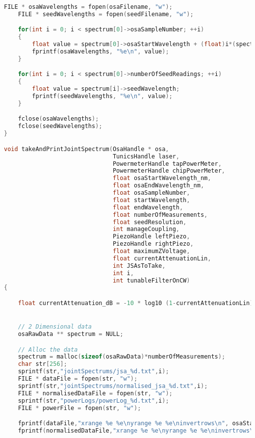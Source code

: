 \begin{lstlisting}[style=customc, language=C]
    FILE * osaWavelengths = fopen(osaFilename, "w");
    FILE * seedWavelengths = fopen(seedFilename, "w");

    for(int i = 0; i < spectrum[0]->osaSampleNumber; ++i)
    {
        float value = spectrum[0]->osaStartWavelength + (float)i*(spectrum[0]->osaEndWavelength - spectrum[0]->osaStartWavelength)/(float)(spectrum[0]->osaSampleNumber-1);
        fprintf(osaWavelengths, "%e\n", value);
    }

    for(int i = 0; i < spectrum[0]->numberOfSeedReadings; ++i)
    {
        float value = spectrum[i]->seedWavelength;
        fprintf(seedWavelengths, "%e\n", value);
    }

    fclose(osaWavelengths);
    fclose(seedWavelengths);
}

void takeAndPrintJointSpectrum(OsaHandle * osa,
                               TunicsHandle laser,
                               PowermeterHandle tapPowerMeter,
                               PowermeterHandle chipPowerMeter,
                               float osaStartWavelength_nm,
                               float osaEndWavelength_nm,
                               float osaSampleNumber,
                               float startWavelength,
                               float endWavelength,
                               float numberOfMeasurements,
                               float seedResolution,
                               int manageCoupling,
                               PiezoHandle leftPiezo,
                               PiezoHandle rightPiezo,
                               float maximumZVoltage,
                               float currentAttenuationLin,
                               int JSAsToTake,
                               int i,
                               int tunableFilterOnCW)
{

    float currentAttenuation_dB = -10 * log10 (1-currentAttenuationLin);


    // 2 Dimensional data
    osaRawData ** spectrum = NULL;

    // Alloc the data
    spectrum = malloc(sizeof(osaRawData)*numberOfMeasurements);
    char str[256];
    sprintf(str,"jointSpectrums/jsa_%d.txt",i);
    FILE * dataFile = fopen(str, "w");
    sprintf(str,"jointSpectrums/normalised_jsa_%d.txt",i);
    FILE * normalisedDataFile = fopen(str, "w");
    sprintf(str,"powerLogs/powerLog_%d.txt",i);
    FILE * powerFile = fopen(str, "w");

    fprintf(dataFile,"xrange %e %e\nyrange %e %e\ninvertrows\n", osaStartWavelength_nm, osaEndWavelength_nm, startWavelength, endWavelength);
    fprintf(normalisedDataFile,"xrange %e %e\nyrange %e %e\ninvertrows\n", osaStartWavelength_nm, osaEndWavelength_nm,startWavelength,endWavelength);


\end{lstlisting}
